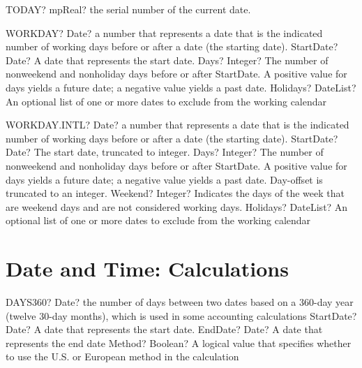 \documentclass[12pt,a4paper,openany]{book}
\begin{document}
\begin{mpFunctionsExtract}
\mpWorksheetFunctionZeroNotImplemented
{TODAY? mpReal? the serial number of the current date.}
\end{mpFunctionsExtract}

\begin{mpFunctionsExtract}
\mpWorksheetFunctionThreeNotImplemented
{WORKDAY? Date? a number that represents a date that is the indicated number of working days before or after a date (the starting date).}
{StartDate? Date? A date that represents the start date.}
{Days? Integer? The number of nonweekend and nonholiday days before or after StartDate. A positive value for days yields a future date; a negative value yields a past date.}
{Holidays? DateList?  An optional list of one or more dates to exclude from the working calendar}
\end{mpFunctionsExtract}

\begin{mpFunctionsExtract}
\mpWorksheetFunctionFourNotImplemented
{WORKDAY.INTL? Date? a number that represents a date that is the indicated number of working days before or after a date (the starting date).}
{StartDate? Date? The start date, truncated to integer.}
{Days? Integer? The number of nonweekend and nonholiday days before or after StartDate. A positive value for days yields a future date; a negative value yields a past date.  Day-offset is truncated to an integer.}
{Weekend? Integer? Indicates the days of the week that are weekend days and are not considered working days.}
{Holidays? DateList?  An optional list of one or more dates to exclude from the working calendar}
\end{mpFunctionsExtract}

\section{Date and Time: Calculations}

\begin{mpFunctionsExtract}
\mpWorksheetFunctionThreeNotImplemented
{DAYS360? Date? the number of days between two dates based on a 360-day year (twelve 30-day months), which is used in some accounting calculations}
{StartDate? Date? A date that represents the start date.}
{EndDate? Date? A date that represents the end date}
{Method? Boolean?  A logical value that specifies whether to use the U.S. or European method in the calculation}
\end{mpFunctionsExtract}
\end{document}
